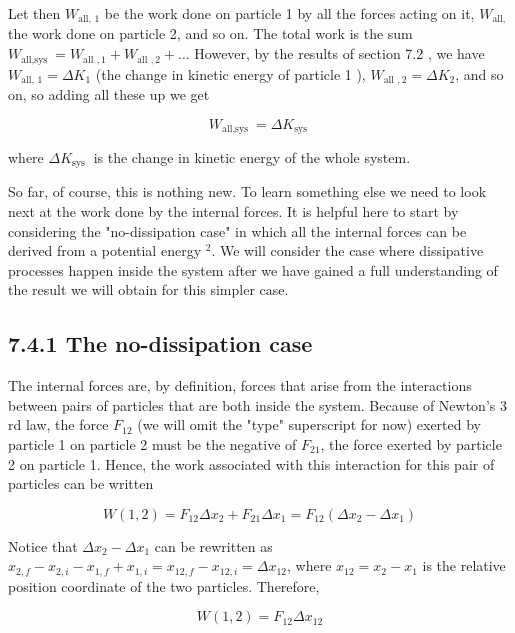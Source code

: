 \documentclass[10pt]{article}
\begin{document}
Let then $W_{\text {all, } 1}$ be the work done on particle 1 by all the forces acting on it, $W_{\text {all, }}$ the work done on particle 2, and so on. The total work is the sum $W_{\text {all,sys }}=W_{\text {all }, 1}+W_{\text {all }, 2}+\ldots$ However, by the results of section 7.2 , we have $W_{\text {all, } 1}=\Delta K_{1}$ (the change in kinetic energy of particle 1 ), $W_{\text {all }, 2}=\Delta K_{2}$, and so on, so adding all these up we get


\begin{equation*}
W_{\text {all,sys }}=\Delta K_{\text {sys }} \tag{7.13}
\end{equation*}


where $\Delta K_{\text {sys }}$ is the change in kinetic energy of the whole system.

So far, of course, this is nothing new. To learn something else we need to look next at the work done by the internal forces. It is helpful here to start by considering the "no-dissipation case" in which all the internal forces can be derived from a potential energy ${ }^{2}$. We will consider the case where dissipative processes happen inside the system after we have gained a full understanding of the result we will obtain for this simpler case.

\subsection*{7.4.1 The no-dissipation case}
The internal forces are, by definition, forces that arise from the interactions between pairs of particles that are both inside the system. Because of Newton's 3 rd law, the force $F_{12}$ (we will omit the "type" superscript for now) exerted by particle 1 on particle 2 must be the negative of $F_{21}$, the force exerted by particle 2 on particle 1. Hence, the work associated with this interaction for this pair of particles can be written


\begin{equation*}
W(1,2)=F_{12} \Delta x_{2}+F_{21} \Delta x_{1}=F_{12}\left(\Delta x_{2}-\Delta x_{1}\right) \tag{7.14}
\end{equation*}


Notice that $\Delta x_{2}-\Delta x_{1}$ can be rewritten as $x_{2, f}-x_{2, i}-x_{1, f}+x_{1, i}=x_{12, f}-x_{12, i}=\Delta x_{12}$, where $x_{12}=x_{2}-x_{1}$ is the relative position coordinate of the two particles. Therefore,


\begin{equation*}
W(1,2)=F_{12} \Delta x_{12} \tag{7.15}
\end{equation*}
\end{document}
